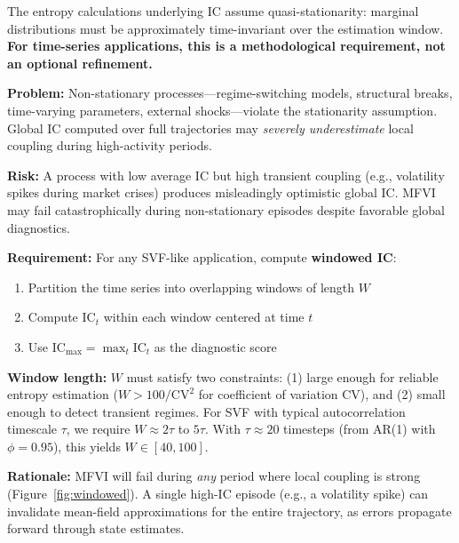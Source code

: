 \documentclass[10pt]{article} %
\theoremstyle{plain}
\theoremstyle{definition}
\newcommand{\IC}{\mathrm{IC}}  %
\begin{document}
The entropy calculations underlying IC assume quasi-stationarity: marginal distributions must be approximately time-invariant over the estimation window. \textbf{For time-series applications, this is a methodological requirement, not an optional refinement.}

\begin{tcolorbox}[breakable, colback=gray!10, colframe=black, title=\textbf{Required: Windowed IC for Time Series}, fonttitle=\bfseries]
\textbf{Problem:} Non-stationary processes---regime-switching models, structural breaks, time-varying parameters, external shocks---violate the stationarity assumption. Global IC computed over full trajectories may \emph{severely underestimate} local coupling during high-activity periods.

\textbf{Risk:} A process with low average IC but high transient coupling (e.g., volatility spikes during market crises) produces misleadingly optimistic global IC. MFVI may fail catastrophically during non-stationary episodes despite favorable global diagnostics.

\textbf{Requirement:} For any SVF-like application, compute \textbf{windowed IC}:
\begin{enumerate}
    \item Partition the time series into overlapping windows of length $W$
    \item Compute $\IC_t$ within each window centered at time $t$
    \item Use $\IC_{\max} = \max_t \IC_t$ as the diagnostic score
\end{enumerate}

\textbf{Window length:} $W$ must satisfy two constraints: (1) large enough for reliable entropy estimation ($W > 100/\text{CV}^2$ for coefficient of variation CV), and (2) small enough to detect transient regimes. For SVF with typical autocorrelation timescale $\tau$, we require $W \approx 2\tau$ to $5\tau$. With $\tau \approx 20$ timesteps (from AR(1) with $\phi = 0.95$), this yields $W \in [40, 100]$.

\textbf{Rationale:} MFVI will fail during \emph{any} period where local coupling is strong (Figure~\ref{fig:windowed}). A single high-IC episode (e.g., a volatility spike) can invalidate mean-field approximations for the entire trajectory, as errors propagate forward through state estimates.
\end{tcolorbox}
\end{document}
